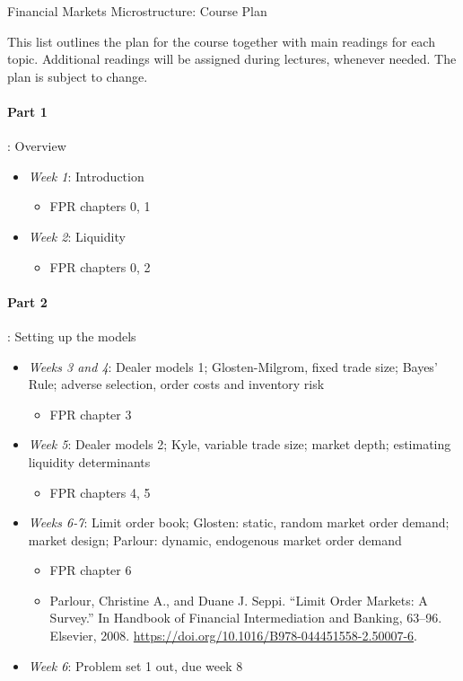 \documentclass{article}
\begin{document}
\begin{center}
	{\huge Financial Markets Microstructure: Course Plan}
\end{center}
\bigskip

This list outlines the plan for the course together with main readings for each topic. Additional readings will be assigned during lectures, whenever needed. The plan is subject to change.
\medskip

\paragraph{Part 1}: Overview
\begin{itemize}
	\item \textit{Week 1}: Introduction
	\begin{itemize}
		\item FPR chapters 0, 1
	\end{itemize}
	\item \textit{Week 2}: Liquidity
	\begin{itemize}
		\item FPR chapters 0, 2
	\end{itemize}
\end{itemize}

\medskip 
\paragraph{Part 2}: Setting up the models
\begin{itemize}
	\item \textit{Weeks 3 and 4}: Dealer models 1; {Glosten-Milgrom}, fixed trade size; Bayes' Rule; adverse selection, order costs and inventory risk
	\begin{itemize}
		\item FPR chapter 3
	\end{itemize}
	\item \textit{Week 5}: Dealer models 2; {Kyle}, variable trade size; market depth; estimating liquidity determinants
	\begin{itemize}
		\item FPR chapters 4, 5
	\end{itemize}
	\item \textit{Weeks 6-7}: Limit order book; {Glosten}: static, random market order demand; market design; {Parlour}: dynamic, endogenous market order demand
	\begin{itemize}
		\item FPR chapter 6
		\item Parlour, Christine A., and Duane J. Seppi. “Limit Order Markets: A Survey.” In Handbook of Financial Intermediation and Banking, 63–96. Elsevier, 2008. \url{https://doi.org/10.1016/B978-044451558-2.50007-6}.
	\end{itemize}
	\item \textit{Week 6}: Problem set 1 out, due week 8
\end{itemize}
\end{document}
